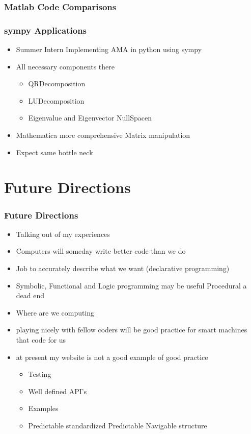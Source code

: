 \documentclass{beamer}
\begin{document}
\begin{frame}
  \frametitle{Matlab Code Comparisons}
  
\end{frame}




\begin{frame}
  \frametitle{sympy Applications}
  
  \begin{itemize}
  \item Summer Intern Implementing AMA in python using sympy
  \item All necessary components there
    \begin{itemize}
    \item QRDecomposition
    \item LUDecomposition
    \item Eigenvalue and Eigenvector  NullSpacen
    \end{itemize}
  \item Mathematica more comprehensive Matrix manipulation
  \item Expect same bottle neck
  \end{itemize}
\end{frame}



\section{Future Directions}

\begin{frame}
  \frametitle{Future Directions}
  \begin{itemize}
  \item Talking out of my experiences
  \item Computers will someday write better code than we do
  \item Job to accurately describe what we want  (declarative programming)
  \item Symbolic, Functional and Logic programming may be useful Procedural
a dead end
\item Where are we computing
\item playing nicely with fellow coders will be good practice for smart 
machines that code for us
  \item at present my website is not a good example of good practice
    \begin{itemize}
    \item Testing
    \item Well defined API's
    \item Examples
    \item Predictable standardized Predictable Navigable structure
    \end{itemize}
  \end{itemize}
\end{frame}
\end{document}
